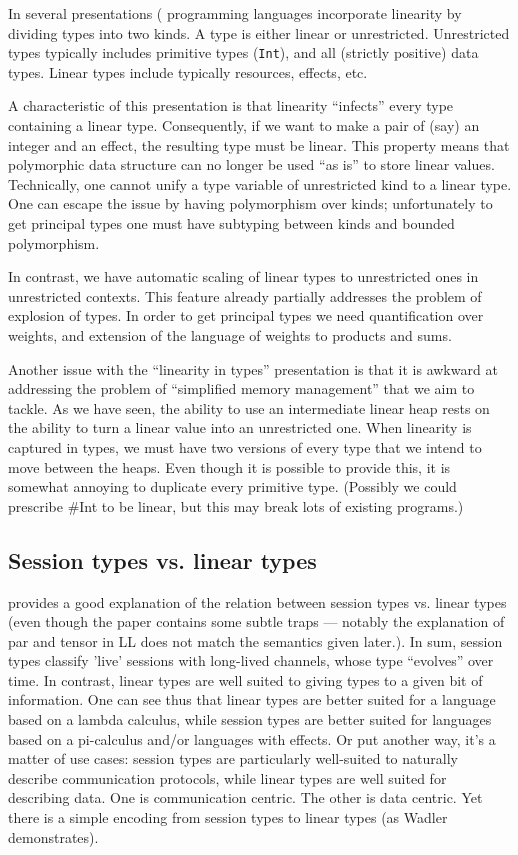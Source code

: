 \documentclass[11pt]{article}
\begin{document}
In several presentations (\cite{wadler_linear_1990,mazurak_lightweight_2010,morris_best_2016}
programming languages incorporate
linearity by dividing types into two kinds. A type is either linear
or unrestricted. Unrestricted types typically includes primitive types
(\texttt{Int}), and all (strictly positive) data types. Linear types
include typically resources, effects, etc.

A characteristic of this presentation is that linearity ``infects''
every type containing a linear type. Consequently, if we want to make
a pair of (say) an integer and an effect, the resulting type must be
linear. This property means that polymorphic data structure can no
longer be used ``as is'' to store linear values. Technically, one
cannot unify a type variable of unrestricted kind to a linear
type. One can escape the issue by having polymorphism over kinds;
unfortunately to get principal types one must have subtyping between
kinds and bounded polymorphism.

In contrast, we have automatic scaling of linear types to unrestricted
ones in unrestricted contexts. This feature already partially
addresses the problem of explosion of types. In order to get principal
types we need quantification over weights, and extension of the
language of weights to products and sums.

Another issue with the ``linearity in types'' presentation is that it
is awkward at addressing the problem of ``simplified memory
management'' that we aim to tackle. As we have seen, the ability to
use an intermediate linear heap rests on the ability to turn a linear
value into an unrestricted one. When linearity is captured in types,
we must have two versions of every type that we intend to move between
the heaps. Even though it is possible to provide this, it is somewhat
annoying to duplicate every primitive type. (Possibly we could
prescribe \#Int to be linear, but this may break lots of existing
programs.)

\subsection{Session types vs. linear types}

\Textcite{wadler_propositions_2012} provides a good explanation of
the relation between session types vs. linear types (even though the
paper contains some subtle traps --- notably the explanation of par
and tensor in LL does not match the semantics given later.). In sum,
session types classify 'live' sessions with long-lived channels, whose
type ``evolves'' over time. In contrast, linear types are well suited
to giving types to a given bit of information. One can see thus that
linear types are better suited for a language based on a lambda
calculus, while session types are better suited for languages based on
a pi-calculus and/or languages with effects. Or put another way,
it's a matter of use cases: session types are particularly well-suited
to naturally describe communication protocols, while linear types are
well suited for describing data. One is communication centric. The
other is data centric. Yet there is a simple
encoding from session types to linear types (as Wadler demonstrates).

\printbibliography
\end{document}
